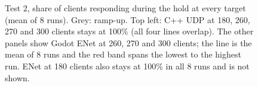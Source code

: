 \documentclass[11pt]{article}
\begin{document}
\begin{figure}[!htbp]
\caption{Test 2, share of clients responding during the hold at every target (mean of 8 runs). Grey: ramp-up. Top left: C++ UDP at 180, 260, 270 and 300 clients stays at 100\% (all four lines overlap). The other panels show Godot ENet at 260, 270 and 300 clients; the line is the mean of 8 runs and the red band spans the lowest to the highest run. ENet at 180 clients also stays at 100\% in all 8 runs and is not shown.}
\label{fig:holdall}
\end{figure}
\end{document}
